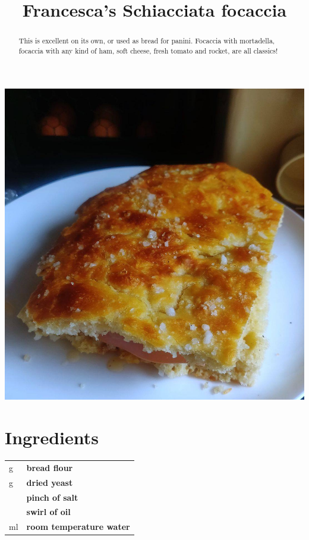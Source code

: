 \documentclass[main.tex]{subfiles}
\title{Francesca's Schiacciata focaccia}
\begin{document}
\maketitle%

\begin{abstract}
This is excellent on its own, or used as bread for panini. Focaccia with mortadella, focaccia with any kind of ham, soft cheese, fresh tomato and rocket, are all classics!
\end{abstract}

\begin{marginfigure}%
  \includegraphics[width=\linewidth]{francesca-focaccia.jpg}
\end{marginfigure}

\section{Ingredients}

\vspace*{-\baselineskip}
\begin{table}[ht]
	\begin{tabularx}{\textwidth}{>{\hsize=0.333\hsize}X>{\bf\hsize=1\hsize}X}
	\unit[500]{g} & bread flour\\
	\unit[7]{g} & dried yeast\\
	\unit[]{} & pinch of salt\\
	\unit[]{} & swirl of oil\\
	\unit[400]{ml} & room temperature water\\
	\end{tabularx}
\end{table}
\end{document}
